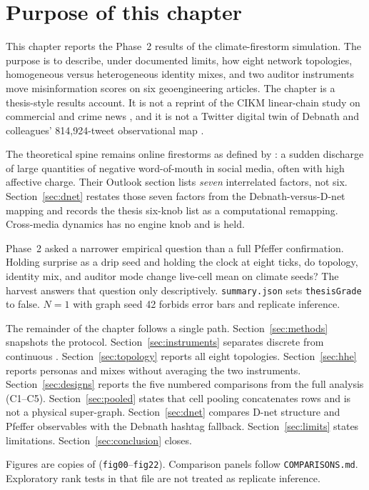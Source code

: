 \section{Purpose of this chapter}
\label{sec:intro}

This chapter reports the Phase~2 results of the climate-firestorm simulation.
The purpose is to describe, under documented limits, how eight network topologies, homogeneous versus heterogeneous identity mixes, and two auditor instruments move misinformation scores on six geoengineering articles.
The chapter is a thesis-style results account.
It is not a reprint of the CIKM linear-chain study on commercial and crime news \parencite{maurya2025simulating}, and it is not a Twitter digital twin of Debnath and colleagues' 814,924-tweet observational map \parencite{debnath2023conspiracy}.

The theoretical spine remains online firestorms as defined by \textcite{pfeffer2014firestorms}: a sudden discharge of large quantities of negative word-of-mouth in social media, often with high affective charge.
Their Outlook section lists \emph{seven} interrelated factors, not six.
Section~\ref{sec:dnet} restates those seven factors from the Debnath-versus-D-net mapping and records the thesis six-knob list as a computational remapping.
Cross-media dynamics has no engine knob and is held.

Phase~2 asked a narrower empirical question than a full Pfeffer confirmation.
Holding surprise as a drip seed and holding the clock at eight ticks, do topology, identity mix, and auditor mode change live-cell mean \MI{} on climate seeds?
The harvest answers that question only descriptively.
\texttt{summary.json} sets \texttt{thesisGrade} to false.
$N=1$ with graph seed 42 forbids error bars and replicate inference.

The remainder of the chapter follows a single path.
Section~\ref{sec:methods} snapshots the protocol.
Section~\ref{sec:instruments} separates discrete from continuous \MPR{}.
Section~\ref{sec:topology} reports all eight topologies.
Section~\ref{sec:hhe} reports personas and mixes without averaging the two instruments.
Section~\ref{sec:designs} reports the five numbered comparisons from the full analysis (C1--C5).
Section~\ref{sec:pooled} states that cell pooling concatenates rows and is not a physical super-graph.
Section~\ref{sec:dnet} compares D-net structure and Pfeffer observables with the Debnath hashtag fallback.
Section~\ref{sec:limits} states limitations.
Section~\ref{sec:conclusion} closes.

Figures are copies of  (\texttt{fig00}--\texttt{fig22}).
Comparison panels follow \texttt{COMPARISONS.md}.
Exploratory rank tests in that file are not treated as replicate inference.
